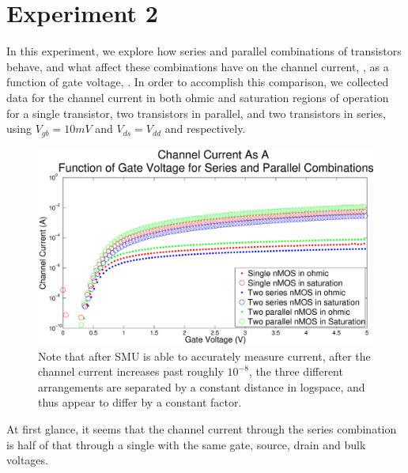 \section*{Experiment 2}
In this experiment, we explore how series and parallel combinations of \nMOS transistors behave, 
and what affect these combinations have on the channel current, \Isat, as a function of gate voltage,
\Vg. In order to accomplish this comparison, we collected data for the channel current in both ohmic 
and saturation regions of operation for a single \nMOS transistor, two transistors in parallel, and
two transistors in series, using $V_{gb} = 10mV$ and $ V_{ds} = V_{dd}$ and respectively.

\begin{figure}[H]
\centering
\includegraphics[width=\linewidth]{../Figures/Experiment2Currents.eps}
\caption{Note that after SMU is able to accurately measure current, after the channel current increases past roughly $10^{-8}$, the three different arrangements are separated by a constant distance in logspace, and thus appear to differ by a constant factor.}
\label{fig:nmosdia}
\end{figure}

At first glance, it seems that the channel current through the series combination is half of that through a single \nMOS with the same gate, source, drain and bulk voltages.